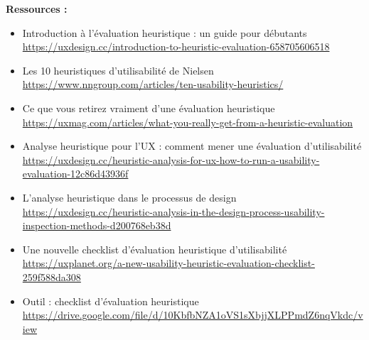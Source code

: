\textbf{Ressources :}

\begin{itemize}
\item Introduction à l'évaluation heuristique : un guide pour débutants \url{https://uxdesign.cc/introduction-to-heuristic-evaluation-658705606518}
\item Les 10 heuristiques d'utilisabilité de Nielsen \url{https://www.nngroup.com/articles/ten-usability-heuristics/}
\item Ce que vous retirez vraiment d'une évaluation heuristique \url{https://uxmag.com/articles/what-you-really-get-from-a-heuristic-evaluation}
\item Analyse heuristique pour l'UX : comment mener une évaluation d'utilisabilité \url{https://uxdesign.cc/heuristic-analysis-for-ux-how-to-run-a-usability-evaluation-12c86d43936f}
\item L'analyse heuristique dans le processus de design \url{https://uxdesign.cc/heuristic-analysis-in-the-design-process-usability-inspection-methods-d200768eb38d}
\item Une nouvelle checklist d'évaluation heuristique d'utilisabilité \url{https://uxplanet.org/a-new-usability-heuristic-evaluation-checklist-259f588da308}
\item Outil : checklist d'évaluation heuristique \url{https://drive.google.com/file/d/10KbfbNZA1oVS1sXbjjXLPPmdZ6nqVkdc/view}
\end{itemize}

